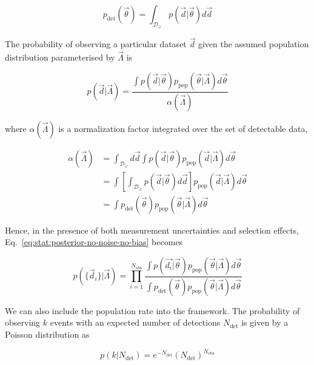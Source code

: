 \documentclass[%
preprint,
nofootinbib,
 amsmath,amssymb,
 aps,
]{revtex4-2}
\newcommand{\given}[2]{p( #1 | #2 )}
\newcommand{\ppop}[0]{p_{\text{pop}}}
\newcommand{\pdet}[0]{p_{\text{det}}}
\newcommand{\ndet}[0]{N_{\text{det}}}
\newcommand{\nobs}[0]{N_{\text{obs}}}
\begin{document}
\begin{equation}
	\label{eq:stat:detection-prob}
	\pdet(\vec{\theta}) = \int_{\mathcal{D}_\geq} \given{\vec{d}}{\vec{\theta}}d\vec{d}
\end{equation}

The probability of observing a particular dataset $\vec{d}$ given the assumed population
distribution parameterised by $\vec{\Lambda}$ is

\begin{equation}
	\given{\vec{d}}{\vec{\Lambda}} =
	\frac{\int \given{\vec{d}}{\vec{\theta}} \ppop(\vec{\theta} | \vec{\Lambda} ) d\vec{\theta}}{\alpha(\vec{\Lambda})}
\end{equation}

where $\alpha(\vec{\Lambda})$ is a normalization factor integrated over the set of detectable data,

\begin{align}
	\alpha(\vec{\Lambda}) & =
	\int_{\mathcal{D}_\geq} d\vec{d} \int \given{\vec{d}}{\vec{\theta}} \ppop(\vec{d} | \vec{\Lambda} ) d\vec{\theta}                                           \\
	                      & = \int \left[ \int_{\mathcal{D}_\geq} \given{\vec{d}}{\vec{\theta}} d\vec{d} \right]  \ppop(\vec{d} | \vec{\Lambda} ) d\vec{\theta} \\
	\label{eq:stat:nalpha}
	                      & = \int \pdet(\vec{\theta}) \ppop(\vec{\theta} | \vec{\Lambda} ) d\vec{\theta}
\end{align}

Hence, in the presence of both measurement uncertainties and selection effects,
Eq.~\eqref{eq:stat:posterior-no-noise-no-bias} becomes

\begin{equation}
	\given{\{ \vec{d}_i \}}{\vec{\Lambda}} =
	\prod_{i=1}^{\nobs}
	\frac{\int \given{\vec{d_i}}{\vec{\theta}} \ppop(\vec{\theta} | \vec{\Lambda} ) d\vec{\theta}}{\int \pdet(\vec{\theta}) \ppop(\vec{\theta} | \vec{\Lambda} ) d\vec{\theta}}
\end{equation}

We can also include the population rate into the framework. The probability of observing $k$ events
with an expected number of detections $\ndet$ is given by a Poisson distribution as

\begin{equation}
	\label{eq:stat:poisson}
	\given{k}{\ndet} = e^{-\ndet}(\ndet)^{\nobs}
\end{equation}
\end{document}
